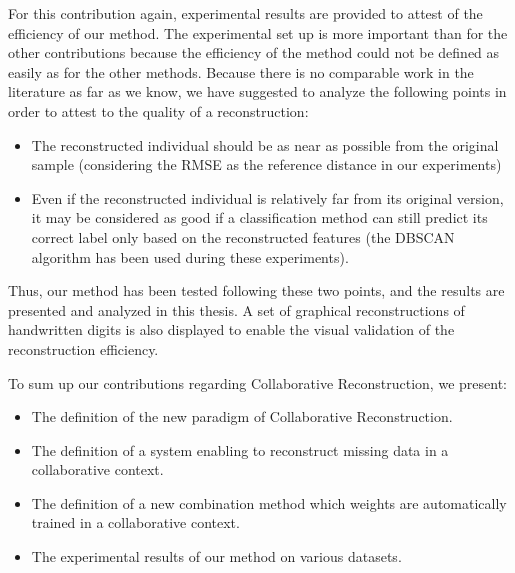 For this contribution again, experimental results are provided to attest of the efficiency of our method. The experimental set up is more important than for the other contributions because the efficiency of the method could not be defined as easily as for the other methods. Because there is no comparable work in the literature as far as we know, we have suggested to analyze the following points in order to attest to the quality of a reconstruction:
\begin{itemize}
    \item The reconstructed individual should be as near as possible from the original sample (considering the RMSE as the reference distance in our experiments)
    \item Even if the reconstructed individual is relatively far from its original version, it may be considered as good if a classification method can still predict its correct label only based on the reconstructed features (the DBSCAN algorithm has been used during these experiments).
\end{itemize}

Thus, our method has been tested following these two points, and the results are presented and analyzed in this thesis. A set of graphical reconstructions of handwritten digits is also displayed to enable the visual validation of the reconstruction efficiency.

To sum up our contributions regarding Collaborative Reconstruction, we present:
\begin{itemize}
    \item The definition of the new paradigm of Collaborative Reconstruction.
    \item The definition of a system enabling to reconstruct missing data in a collaborative context.
    \item The definition of a new combination method which weights are automatically trained in a collaborative context.
    \item The experimental results of our method on various datasets.
\end{itemize}


